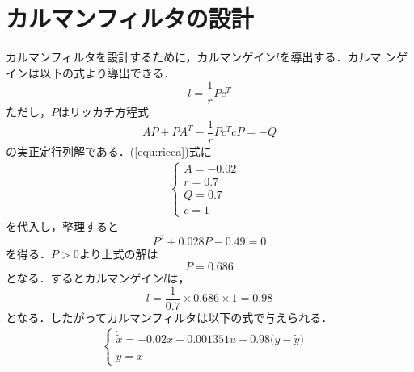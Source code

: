 \documentclass[a4paper,12pt]{jarticle}
\begin{document}
\section{カルマンフィルタの設計}
カルマンフィルタを設計するために，カルマンゲイン$l$を導出する．カルマ
ンゲインは以下の式より導出できる．
\begin{equation}\label{equ:gain}
 l = \frac{1}{r}Pc^T
\end{equation}
ただし，$P$はリッカチ方程式
\begin{equation}\label{equ:ricca}
 AP + PA^T -\frac{1}{r}Pc^TcP = -Q 
\end{equation}
の実正定行列解である．(\ref{equ:ricca})式に
\begin{eqnarray}
 \begin{cases}
  A = -0.02 & \\
  r = 0.7 & \\
  Q = 0.7 & \\
  c = 1
 \end{cases}
\end{eqnarray}
を代入し，整理すると
\begin{equation}
 P^2 + 0.028P -0.49 = 0
\end{equation}
を得る．$P > 0$より上式の解は
\begin{equation}
 P = 0.686
\end{equation}
となる．するとカルマンゲイン$l$は，
\begin{equation}
 l = \frac{1}{0.7} \times 0.686 \times 1 = 0.98
\end{equation}
となる．したがってカルマンフィルタは以下の式で与えられる．
\begin{eqnarray}
 \begin{cases}
\dot{\tilde{x}} = -0.02x + 0.001351u + 0.98 \big(y - \tilde{y} \big)
  & \\
  \tilde{y} = \tilde{x}
 \end{cases}
\end{eqnarray}


\end{document}

